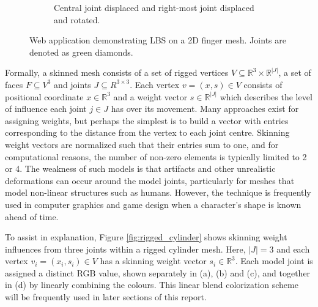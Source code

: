 \begin{figure}[H]
\begin{subfigure}{0.48\linewidth}
                \caption{Central joint displaced and right-most joint displaced and rotated.}
            \end{subfigure}%
            \caption{Web application demonstrating LBS on a 2D finger mesh. Joints are denoted as green diamonds.}
            \label{fig:finger_model}
        \end{figure}

        \clearpage
        Formally, a skinned mesh consists of a set of rigged vertices $V \subseteq \mathbb{R}^3 \times \mathbb{R}^{|J|}$, a set of faces $F \subseteq V^3$ and joints $J \subseteq R^{3\times3}$. Each vertex $v = (x, s) \in V$ consists of positional coordinate $x \in \mathbb{R}^{3}$ and a weight vector $s \in \mathbb{R}^{|J|}$ which describes the level of influence each joint $j \in J$ has over its movement. Many approaches exist for assigning weights, but perhaps the simplest is to build a vector with entries corresponding to the distance from the vertex to each joint centre. Skinning weight vectors are normalized such that their entries sum to one, and for computational reasons, the number of non-zero elements is typically limited to 2 or 4. The weakness of such models is that artifacts and other unrealistic deformations can occur around the model joints, particularly for meshes that model non-linear structures such as humans. However, the technique is frequently used in computer graphics and game design when a character's shape is known ahead of time.

        To assist in explanation, Figure \ref{fig:rigged_cylinder} shows skinning weight influences from three joints within a rigged cylinder mesh. Here, $|J| = 3$ and each vertex $v_{i} = (x_{i}, s_{i}) \in V$ has a skinning weight vector $s_{i} \in \mathbb{R}^{3}$. Each model joint is assigned a distinct RGB value, shown separately in (a), (b) and (c), and together in (d) by linearly combining the colours. This linear blend colorization scheme will be frequently used in later sections of this report.

